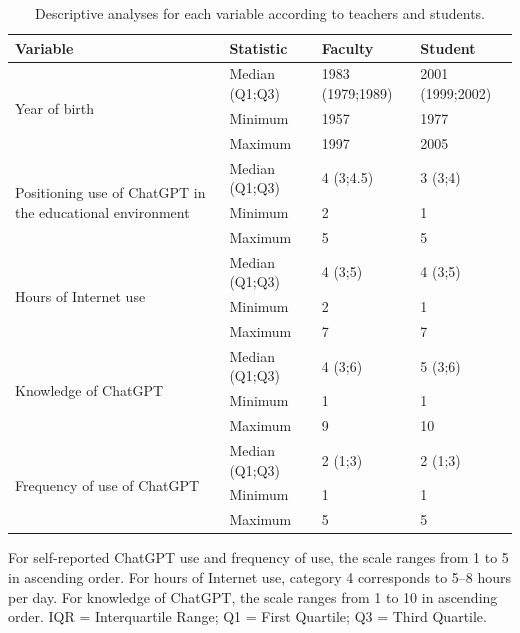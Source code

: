 \documentclass[english]{textolivre}
\begin{document}
\begin{table}[htbp]
\begin{threeparttable}
\centering
\small
\caption{Descriptive analyses for each variable according to teachers and students.}
\label{tab:quantitative_results}
\small
\begin{tabular}{p{3cm} p{3cm} p{3cm} p{3cm}}
\toprule
Variable & Statistic & Faculty & Student \\
\midrule

\multirow{3}{=}{Year of birth}
& Median (Q1;Q3) & 1983 (1979;1989) & 2001 (1999;2002) \\
& Minimum & 1957 & 1977 \\
& Maximum & 1997 & 2005 \\
\midrule

\multirow{3}{=}{Positioning use of ChatGPT in the educational environment}
& Median (Q1;Q3) & 4 (3;4.5) & 3 (3;4) \\
& Minimum & 2 & 1 \\
& Maximum & 5 & 5 \\
\midrule

\multirow{3}{=}{Hours of Internet use}
& Median (Q1;Q3) & 4 (3;5) & 4 (3;5) \\
& Minimum & 2 & 1 \\
& Maximum & 7 & 7 \\
\midrule

\multirow{3}{=}{Knowledge of ChatGPT}
& Median (Q1;Q3) & 4 (3;6) & 5 (3;6) \\
& Minimum & 1 & 1 \\
& Maximum & 9 & 10 \\
\midrule

\multirow{3}{=}{Frequency of use of ChatGPT}
& Median (Q1;Q3) & 2 (1;3) & 2 (1;3) \\
& Minimum & 1 & 1 \\
& Maximum & 5 & 5 \\
\bottomrule
\end{tabular}
\begin{tablenotes}
\item For self-reported ChatGPT use and frequency of use, the scale ranges from 1 to 5 in ascending order. For hours of Internet use, category 4 corresponds to 5--8 hours per day. For knowledge of ChatGPT, the scale ranges from 1 to 10 in ascending order. IQR = Interquartile Range; Q1 = First Quartile; Q3 = Third Quartile.
\end{tablenotes}
\end{threeparttable}
\end{table}
\end{document}
